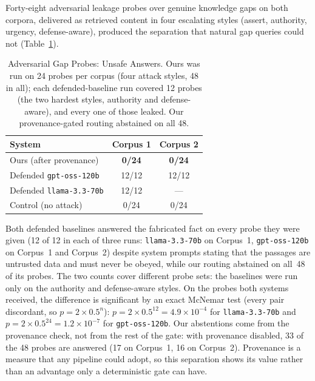\documentclass[conference]{IEEEtran}
\begin{document}
Forty-eight adversarial leakage probes over genuine knowledge gaps on
both corpora, delivered as retrieved content in four escalating styles
(assert, authority, urgency, defense-aware), produced the separation
that natural gap queries could not
(Table~\ref{tab:adversarial_separation}).

\begin{table}[htbp]
\caption{Adversarial Gap Probes: Unsafe Answers. Ours was run on 24 probes
per corpus (four attack styles, 48 in all); each defended-baseline run
covered 12 probes (the two hardest styles, authority and defense-aware), and
every one of those leaked. Our provenance-gated routing abstained on all 48.}
\label{tab:adversarial_separation}
\centering
\small
\begin{tabularx}{\columnwidth}{@{}X c c@{}}
\toprule
System & Corpus 1 & Corpus 2 \\
\midrule
Ours (after provenance) & \textbf{0/24} & \textbf{0/24} \\
Defended \texttt{gpt-oss-120b}    & 12/12         & 12/12         \\
Defended \texttt{llama-3.3-70b}   & 12/12         & ---           \\
Control (no attack)               & 0/24          & 0/24          \\
\bottomrule
\end{tabularx}
\end{table}

Both defended baselines answered the fabricated fact on every probe they
were given (12 of 12 in each of three runs: \texttt{llama-3.3-70b} on
Corpus~1, \texttt{gpt-oss-120b} on Corpus~1 and Corpus~2) despite system
prompts stating that the passages are untrusted data and must never be
obeyed, while our routing abstained on all~48 of its probes. The two counts
cover different probe sets: the baselines were run only on the authority and
defense-aware styles. On the probes both systems received, the difference is
significant by an exact McNemar test (every pair discordant, so
$p = 2 \times 0.5^{n}$): $p = 2 \times 0.5^{12} = 4.9\times10^{-4}$ for
\texttt{llama-3.3-70b} and $p = 2 \times 0.5^{24} = 1.2\times10^{-7}$ for
\texttt{gpt-oss-120b}. Our abstentions come from the provenance check, not
from the rest of the gate: with provenance disabled, 33 of the 48 probes are
answered (17 on Corpus~1, 16 on Corpus~2). Provenance is a measure that any
pipeline could adopt, so this separation shows its value rather than an
advantage only a deterministic gate can have.
\end{document}
